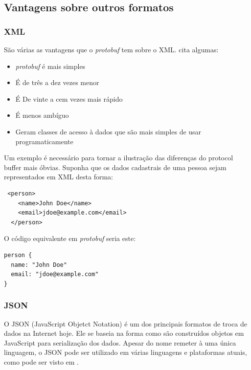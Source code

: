 \subsection{Vantagens sobre outros formatos}

\subsubsection{XML}

São várias as vantagens que o \emph{protobuf} tem sobre o XML. \cite{protobuf_overview} cita algumas:

\begin{itemize}
	\item \emph{protobuf} é mais simples
	\item É de três a dez vezes menor
	\item É De vinte a cem vezes mais rápido
	\item É menos ambíguo
	\item Geram classes de acesso à dados que são mais simples de usar programaticamente
\end{itemize}

Um exemplo é necessário para tornar a ilustração das diferenças do protocol buffer mais óbvias. Suponha que os dados cadastrais de uma pessoa sejam representados em XML desta forma:

\begin{lstlisting}
 <person>
    <name>John Doe</name>
    <email>jdoe@example.com</email>
  </person>
\end{lstlisting}

O código equivalente em \emph{protobuf} seria este:

\begin{lstlisting}
person {
  name: "John Doe"
  email: "jdoe@example.com"
}
\end{lstlisting}


\subsubsection{JSON}

O JSON (JavaScript Objetct Notation) é um dos principais formatos de troca de dados na Internet hoje. Ele se baseia na forma como são construídos objetos em JavaScript para serialização dos dados. Apesar do nome remeter à uma única linguagem, o JSON pode ser utilizado em várias linguagens e plataformas atuais, como pode ser visto em \cite{json}.


